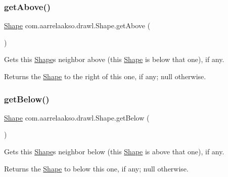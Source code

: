 \subsubsection{\texorpdfstring{get\+Above()}{getAbove()}}
{\footnotesize\ttfamily \hyperlink{classcom_1_1aarrelaakso_1_1drawl_1_1_shape}{Shape} com.\+aarrelaakso.\+drawl.\+Shape.\+get\+Above (\begin{DoxyParamCaption}{ }\end{DoxyParamCaption})}



Gets this \hyperlink{classcom_1_1aarrelaakso_1_1drawl_1_1_shape}{Shape}\textquotesingle{}s neighbor above (this \hyperlink{classcom_1_1aarrelaakso_1_1drawl_1_1_shape}{Shape} is below that one), if any. 

\begin{DoxyReturn}{Returns}
the \hyperlink{classcom_1_1aarrelaakso_1_1drawl_1_1_shape}{Shape} to the right of this one, if any; {\ttfamily null} otherwise. 
\end{DoxyReturn}
\mbox{\label{classcom_1_1aarrelaakso_1_1drawl_1_1_shape_a53de5ab609d879719cd3b372dfe8df58}} 
\subsubsection{\texorpdfstring{get\+Below()}{getBelow()}}
{\footnotesize\ttfamily \hyperlink{classcom_1_1aarrelaakso_1_1drawl_1_1_shape}{Shape} com.\+aarrelaakso.\+drawl.\+Shape.\+get\+Below (\begin{DoxyParamCaption}{ }\end{DoxyParamCaption})}



Gets this \hyperlink{classcom_1_1aarrelaakso_1_1drawl_1_1_shape}{Shape}\textquotesingle{}s neighbor below (this \hyperlink{classcom_1_1aarrelaakso_1_1drawl_1_1_shape}{Shape} is above that one), if any. 

\begin{DoxyReturn}{Returns}
the \hyperlink{classcom_1_1aarrelaakso_1_1drawl_1_1_shape}{Shape} to below this one, if any; {\ttfamily null} otherwise. 
\end{DoxyReturn}
\mbox{\label{classcom_1_1aarrelaakso_1_1drawl_1_1_shape_aba14efe9a16c0808580963c66b171082}} 
